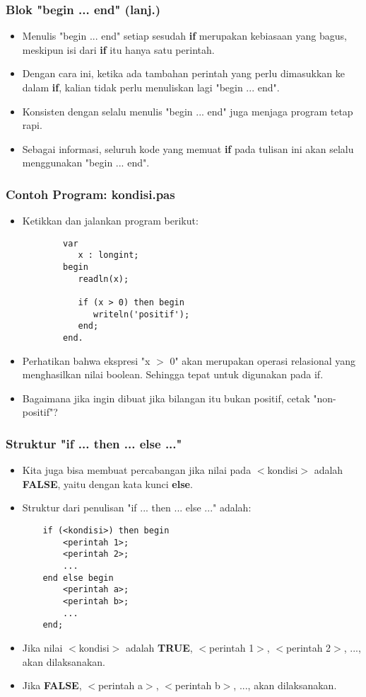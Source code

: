\documentclass{beamer}
\begin{document}
\begin{frame}[fragile]
\frametitle{Blok "begin ... end" (lanj.)}
\begin{itemize}
	\item Menulis "begin ... end" setiap sesudah \textbf{if} merupakan kebiasaan yang bagus, meskipun isi dari \textbf{if} itu hanya satu perintah.
	\item Dengan cara ini, ketika ada tambahan perintah yang perlu dimasukkan ke dalam \textbf{if}, kalian tidak perlu menuliskan lagi "begin ... end".
	\item Konsisten dengan selalu menulis "begin ... end" juga menjaga program tetap rapi.
	\item Sebagai informasi, seluruh kode yang memuat \textbf{if} pada tulisan ini akan selalu menggunakan "begin ... end".
\end{itemize}
\end{frame}

\begin{frame}[fragile]
\frametitle{Contoh Program: kondisi.pas}
\begin{itemize}
	\item Ketikkan dan jalankan program berikut:
	\begin{lstlisting}
		var
		   x : longint;
		begin
		   readln(x);
		
		   if (x > 0) then begin
		      writeln('positif');
		   end;
		end.
	\end{lstlisting}
	\item Perhatikan bahwa ekspresi "x $>$ 0" akan merupakan operasi relasional yang menghasilkan nilai boolean. Sehingga tepat untuk digunakan pada if.
	\item Bagaimana jika ingin dibuat jika bilangan itu bukan positif, cetak "non-positif"?
\end{itemize}
\end{frame}

\begin{frame}[fragile]
\frametitle{Struktur "if ... then ... else ..."}
\begin{itemize}
	\item Kita juga bisa membuat percabangan jika nilai pada $<$kondisi$>$ adalah \textbf{FALSE}, yaitu dengan kata kunci \textbf{else}.
	\item Struktur dari penulisan "if ... then ... else ..." adalah:
	\begin{lstlisting}
	if (<kondisi>) then begin
	    <perintah 1>;
	    <perintah 2>;
	    ...
	end else begin
	    <perintah a>;
	    <perintah b>;
	    ...	
	end;
	\end{lstlisting}
	
	\item Jika nilai $<$kondisi$>$ adalah \textbf{TRUE}, $<$perintah 1$>$, $<$perintah 2$>$, ..., akan dilaksanakan.
	\item Jika \textbf{FALSE}, $<$perintah a$>$, $<$perintah b$>$, ..., akan dilaksanakan.
\end{itemize}
\end{frame}
\end{document}
